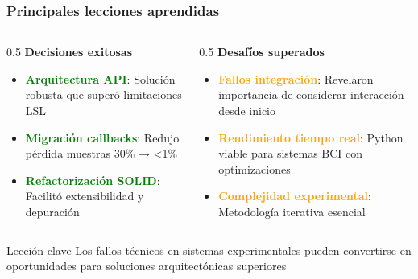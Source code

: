 \documentclass[10pt,thmsa]{beamer}
\theoremstyle{plain}
\begin{document}
\begin{frame}
\frametitle{Principales lecciones aprendidas}

\begin{columns}
\begin{column}{0.5\textwidth}
\textbf{Decisiones exitosas}
\begin{itemize}
\item \textcolor{green}{\textbf{Arquitectura API}}: Solución robusta que superó limitaciones LSL
\item \textcolor{green}{\textbf{Migración callbacks}}: Redujo pérdida muestras 30\% → <1\%
\item \textcolor{green}{\textbf{Refactorización SOLID}}: Facilitó extensibilidad y depuración
\end{itemize}
\end{column}

\begin{column}{0.5\textwidth}
\textbf{Desafíos superados}
\begin{itemize}
\item \textcolor{orange}{\textbf{Fallos integración}}: Revelaron importancia de considerar interacción desde inicio
\item \textcolor{orange}{\textbf{Rendimiento tiempo real}}: Python viable para sistemas BCI con optimizaciones
\item \textcolor{orange}{\textbf{Complejidad experimental}}: Metodología iterativa esencial
\end{itemize}
\end{column}
\end{columns}

\vspace{1em}

\begin{alertblock}{Lección clave}
Los fallos técnicos en sistemas experimentales pueden convertirse en oportunidades para soluciones arquitectónicas superiores
\end{alertblock}

\end{frame}
\end{document}
